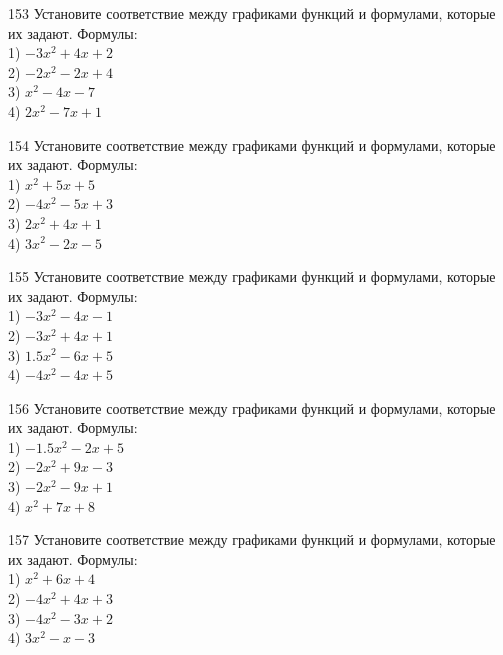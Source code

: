 \documentclass[4apaper]{article}
\begin{document}
\begin{taskBN}{153}
Установите соответствие между графиками функций и формулами, которые их задают. Формулы: \\1) $-3x^2+4x+2$\\2) $-2x^2-2x+4$\\3) $x^2-4x-7$\\4) $2x^2-7x+1$
\end{taskBN}

\begin{taskBN}{154}
Установите соответствие между графиками функций и формулами, которые их задают. Формулы: \\1) $x^2+5x+5$\\2) $-4x^2-5x+3$\\3) $2x^2+4x+1$\\4) $3x^2-2x-5$
\end{taskBN}

\begin{taskBN}{155}
Установите соответствие между графиками функций и формулами, которые их задают. Формулы: \\1) $-3x^2-4x-1$\\2) $-3x^2+4x+1$\\3) $1.5x^2-6x+5$\\4) $-4x^2-4x+5$
\end{taskBN}

\begin{taskBN}{156}
Установите соответствие между графиками функций и формулами, которые их задают. Формулы: \\1) $-1.5x^2-2x+5$\\2) $-2x^2+9x-3$\\3) $-2x^2-9x+1$\\4) $x^2+7x+8$
\end{taskBN}

\begin{taskBN}{157}
Установите соответствие между графиками функций и формулами, которые их задают. Формулы: \\1) $x^2+6x+4$\\2) $-4x^2+4x+3$\\3) $-4x^2-3x+2$\\4) $3x^2-x-3$
\end{taskBN}
\end{document}
